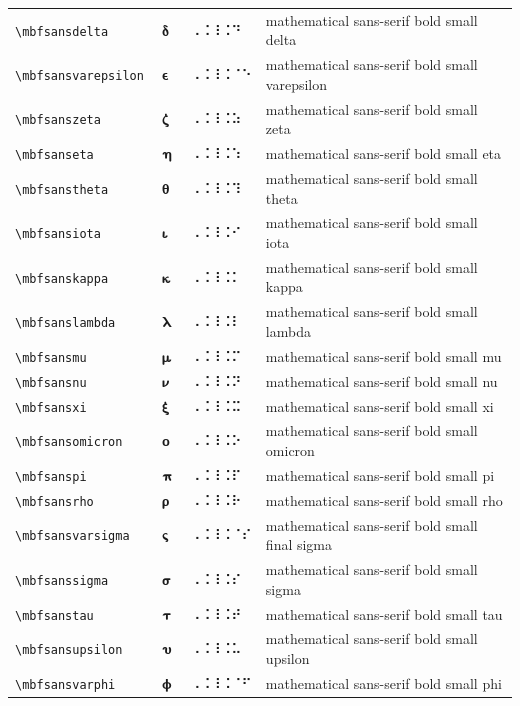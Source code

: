 \documentclass[oneside]{article}
\begin{document}
\begin{longtable}{llll}
\verb|\mbfsansdelta| & $\mbfsansdelta$ &  ⠠⠨⠸⠨⠙  & {mathematical sans-serif bold small delta} \\[2ex]
\verb|\mbfsansvarepsilon| & $\mbfsansvarepsilon$ &  ⠠⠨⠸⠨⠈⠑  & {mathematical sans-serif bold small varepsilon} \\[2ex]
\verb|\mbfsanszeta| & $\mbfsanszeta$ &  ⠠⠨⠸⠨⠵  & {mathematical sans-serif bold small zeta} \\[2ex]
\verb|\mbfsanseta| & $\mbfsanseta$ &  ⠠⠨⠸⠨⠱  & {mathematical sans-serif bold small eta} \\[2ex]
\verb|\mbfsanstheta| & $\mbfsanstheta$ &  ⠠⠨⠸⠨⠹  & {mathematical sans-serif bold small theta} \\[2ex]
\verb|\mbfsansiota| & $\mbfsansiota$ &  ⠠⠨⠸⠨⠊  & {mathematical sans-serif bold small iota} \\[2ex]
\verb|\mbfsanskappa| & $\mbfsanskappa$ &  ⠠⠨⠸⠨⠅  & {mathematical sans-serif bold small kappa} \\[2ex]
\verb|\mbfsanslambda| & $\mbfsanslambda$ &  ⠠⠨⠸⠨⠇  & {mathematical sans-serif bold small lambda} \\[2ex]
\verb|\mbfsansmu| & $\mbfsansmu$ &  ⠠⠨⠸⠨⠍  & {mathematical sans-serif bold small mu} \\[2ex]
\verb|\mbfsansnu| & $\mbfsansnu$ &  ⠠⠨⠸⠨⠝  & {mathematical sans-serif bold small nu} \\[2ex]
\verb|\mbfsansxi| & $\mbfsansxi$ &  ⠠⠨⠸⠨⠭  & {mathematical sans-serif bold small xi} \\[2ex]
\verb|\mbfsansomicron| & $\mbfsansomicron$ &  ⠠⠨⠸⠨⠕  & {mathematical sans-serif bold small omicron} \\[2ex]
\verb|\mbfsanspi| & $\mbfsanspi$ &  ⠠⠨⠸⠨⠏  & {mathematical sans-serif bold small pi} \\[2ex]
\verb|\mbfsansrho| & $\mbfsansrho$ &  ⠠⠨⠸⠨⠗  & {mathematical sans-serif bold small rho} \\[2ex]
\verb|\mbfsansvarsigma| & $\mbfsansvarsigma$ &  ⠠⠨⠸⠨⠈⠎  & {mathematical sans-serif bold small final sigma} \\[2ex]
\verb|\mbfsanssigma| & $\mbfsanssigma$ &  ⠠⠨⠸⠨⠎  & {mathematical sans-serif bold small sigma} \\[2ex]
\verb|\mbfsanstau| & $\mbfsanstau$ &  ⠠⠨⠸⠨⠞  & {mathematical sans-serif bold small tau} \\[2ex]
\verb|\mbfsansupsilon| & $\mbfsansupsilon$ &  ⠠⠨⠸⠨⠥  & {mathematical sans-serif bold small upsilon} \\[2ex]
\verb|\mbfsansvarphi| & $\mbfsansvarphi$ &  ⠠⠨⠸⠨⠈⠋  & {mathematical sans-serif bold small phi} \\[2ex]

\end{longtable}
\end{document}
